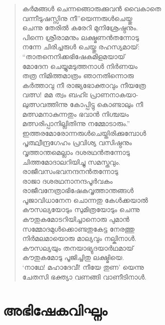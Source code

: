 \begin{verse}
കര്‍മങ്ങള്‍ ചെന്നങ്ങൊരുക്കുവന്‍ വൈകാതെ\\
വന്നീടുഷസ്സിനു നീ”യെന്നരുള്‍ചെയ്തു\\
ചെന്നു തേരില്‍ കരേറി മുനിശ്രേഷ്ഠനും.\\
പിന്നെ ശ്രീരാമനും ലക്ഷ്മണന്‍തന്നോടു\\
നന്നേ ചിരിച്ചരുള്‍ ചെയ്തു രഹസ്യമായ്:\\
“താതനെനിക്കഭിഷേകമിളമയായ്\\
മോദേന ചെയ്യുമടുത്തനാള്‍ നിര്‍ണയം\\
തത്ര നിമിത്തമാത്രം ഞാനതിന്നൊരു\\
കര്‍ത്താവു നീ രാജ്യഭോക്താവും നീയത്രേ\\
വത്സ! മമ ത്വം ബഹിഃ പ്രാണനാകയാ-\\
ലുത്സവത്തിന്നു കോപ്പിട്ടു കൊണ്ടാലും നീ\\
മത്സമനാകുന്നതും ഭവാന്‍ നിശ്ചയം\\
മത്സരിപ്പാനില്ലിതിന്നു നമ്മോടാരും.”\\
ഇത്തരമോരോന്നരുള്‍ചെയ്തിരിക്കുമ്പോള്‍\\
പൃത്ഥ്വീന്ദ്രഗേഹം പ്രവിശ്യ വസിഷ്ഠനും\\
വൃത്താന്തമെല്ലാം ദശരഥന്‍തന്നോടു\\
ചിത്തമോദാലറിയിച്ചു സമസ്തവും.\\
രാജീവസംഭവനന്ദനന്‍തന്നോടു\\
രാജാ ദശരഥനാനന്ദപൂര്‍വകം\\
രാജീവനേത്രാഭിഷേകവൃത്താന്തങ്ങള്‍\\
പൂജാവിധാനേന ചൊന്നതു കേള്‍ക്കയാല്‍\\
കൗസല്യയോടും സുമിത്രയോടും ചെന്നു\\
കൗതുകമോടറിയിച്ചാനൊരു പുമാന്‍\\
സമ്മോദമുള്‍ക്കൊണ്ടതുകേട്ട നേരത്തു\\
നിര്‍മലമായൊരു മാല്യവും നല്കിനാള്‍.\\
കൗസല്യയും തനയാഭ്യുദയാര്‍ഥമായ്\\
കൗതുകമോടു പൂജിച്ചിതു ലക്ഷ്മിയെ.\\
‘നാഥേ! മഹാദേവീ! നീയേ തുണ’ യെന്നു\\
ചേതസി ഭക്ത്യാ വണങ്ങി വാണീടിനാള്‍.
\end{verse}

\section{അഭിഷേകവിഘ്നം}

